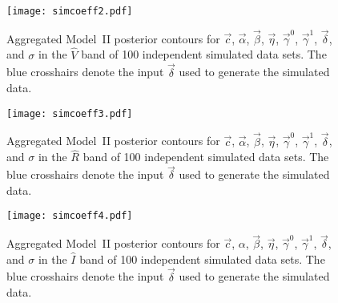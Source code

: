 \documentclass{aastex61}   	%
\begin{document}
\begin{figure}[htbp] %
   \centering
   \texttt{[image: simcoeff2.pdf]} 
            \caption{Aggregated Model~II posterior contours for $\vec{c}$, $\vec{\alpha}$, $\vec{\beta}$, $\vec{\eta}$, $\vec{\gamma}^0$, $\vec{\gamma}^1$,  $\vec{\delta}$, and $\sigma$ in the ${\hat{V}}$ band of \color{red} 100 \color{black} independent simulated data sets.   The blue crosshairs denote the input $\vec{\delta}$ used to generate the simulated data. \label{simglobal3:fig}}
\end{figure}

\begin{figure}[htbp] %
   \centering
      \texttt{[image: simcoeff3.pdf]} 
            \caption{Aggregated Model~II posterior contours for $\vec{c}$, $\vec{\alpha}$, $\vec{\beta}$, $\vec{\eta}$, $\vec{\gamma}^0$, $\vec{\gamma}^1$,  $\vec{\delta}$, and $\sigma$ in the ${\hat{R}}$ band of \color{red} 100 \color{black} independent simulated data sets.   The blue crosshairs denote the input $\vec{\delta}$ used to generate the simulated data.
\label{simglobal4:fig}}
\end{figure}

\begin{figure}[htbp] %
   \centering
         \texttt{[image: simcoeff4.pdf]} 
            \caption{Aggregated Model~II posterior contours for $\vec{c}$, $\alpha$, $\vec{\beta}$, $\vec{\eta}$, $\vec{\gamma}^0$, $\vec{\gamma}^1$,  $\vec{\delta}$, and $\sigma$ in the ${\hat{I}}$ band of \color{red} 100 \color{black} independent simulated data sets.  The blue crosshairs denote the input $\vec{\delta}$ used to generate the simulated data.
 \label{simglobal5:fig}}
\end{figure}




\end{document}
